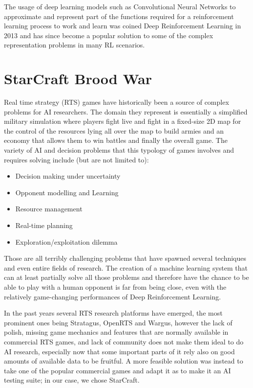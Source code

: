 \documentclass[bsc,frontabs,twoside,singlespacing,parskip,deptreport]{infthesis}     %
\begin{document}
The usage of deep learning models such as Convolutional Neural Networks to
approximate and represent part of the functions required for a reinforcement
learning process to work and learn was coined Deep Reinforcement Learning in
2013 and has since become a popular solution to some of the complex
representation problems in many RL scenarios\cite{mnih2013playing}.

\section{StarCraft Brood War}
Real time strategy (RTS) games have historically been a source of complex
problems for AI researchers. The domain they represent is essentially a
simplified military simulation where players fight live and fight in a
fixed-size 2D map for the control of the resources lying all over the map to
build armies and an economy that allows them to win battles and finally the
overall game. The variety of AI and decision problems that this typology of
games involves and requires solving include (but are not limited to):

\begin{itemize}
  \item Decision making under uncertainty
  \item Opponent modelling and Learning
  \item Resource management
  \item Real-time planning
  \item Exploration/exploitation dilemma
\end{itemize}

Those are all terribly challenging problems that have spawned several techniques
and even entire fields of research. The creation of a machine learning system
that can at least partially solve all those problems and therefore have the
chance to be able to play with a human opponent is far from being close, even
with the relatively game-changing performances of Deep Reinforcement Learning.

In the past years several RTS research platforms have emerged, the most
prominent ones being Stratagus, OpenRTS and Wargus, however the lack of polish,
missing game mechanics and features that are normally available in commercial
RTS games, and lack of community does not make them ideal to do AI research,
especially now that some important parts of it rely also on good amounts of
available data to be fruitful. A more feasible solution was instead to take one
of the popular commercial games and adapt it as to make it an AI testing suite;
in our case, we chose StarCraft.
\end{document}
